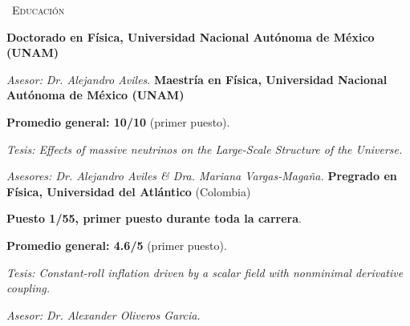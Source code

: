 \begin{rubric}{\faGraduationCap\ \textsc{Educación}}

\entry*[2022 --  presente]%
	\textbf{Doctorado en Física, Universidad Nacional Autónoma de México (UNAM)}\par
    \textit{Asesor:} \emph{Dr. Alejandro Aviles}. %
%
\entry*[2020 -- 2021]%
	\textbf{Maestría en Física, Universidad Nacional Autónoma de México (UNAM)}\par
    \textbf{Promedio general: 10/10} (primer puesto).\par
    \textit{Tesis: Effects of massive neutrinos on the Large-Scale Structure of the Universe.}\par
	\textit{Asesores: Dr. Alejandro Aviles \& Dra. Mariana Vargas-Magaña.}
% 
\entry*[2014 -- 2019]%
    \textbf{Pregrado en Física, Universidad del Atlántico} (Colombia)\par
    \textbf{Puesto 1/55, primer puesto durante toda la carrera}.\par
    \textbf{Promedio general: 4.6/5} (primer puesto).\par
    \textit{Tesis: Constant-roll inflation driven by a scalar field with nonminimal derivative coupling.}\par
	\textit{Asesor: Dr. Alexander Oliveros Garcia.}
\end{rubric}
